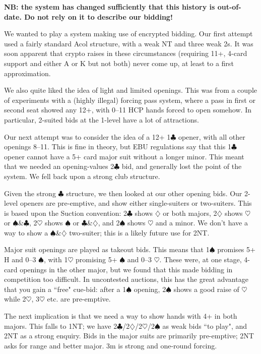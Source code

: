 \documentclass[a4paper,14pt]{extarticle}
\begin{document}
{\bf NB: the system has changed sufficiently that this history is out-of-date.  Do
not rely on it to describe our bidding! }

We wanted to play a system making use of encrypted bidding.  Our first attempt
used a fairly standard Acol structure, with a weak NT and three weak 2s.  It
was soon apparent that crypto raises in these circumstances (requiring 11+,
4-card support and either A or K but not both) never come up, at least to a
first approximation.

We also quite liked the idea of light and limited openings.  This was from a
couple of experiments with a (highly illegal) forcing pass system, where a pass
in first or second seat showed any 12+, with 0--11 HCP hands forced to open
somehow.  In particular, 2-suited bids at the 1-level have a lot of
attractions.

Our next attempt was to consider the idea of a 12+ 1$\clubsuit$ opener, with all other
openings 8--11.  This is fine in theory, but EBU regulations say that this 1$\clubsuit$
opener cannot have a 5+ card major suit without a longer minor.  This meant
that we needed an opening-values 2$\clubsuit$ bid, and generally lost the point of the
system.  We fell back upon a strong club structure.

Given the strong $\clubsuit$ structure, we then looked at our other opening bids.  Our
2-level openers are pre-emptive, and show either single-suiters or two-suiters.
This is based upon the Suction convention: 2$\clubsuit$ shows $\diamondsuit$ or both majors, 2$\diamondsuit$ shows
$\heartsuit$ or $\spadesuit$\&$\clubsuit$, 2$\heartsuit$ shows $\spadesuit$ or $\clubsuit$\&$\diamondsuit$, and 2$\spadesuit$ shows $\heartsuit$ and a minor.  We don't have a way
to show a $\spadesuit$\&$\diamondsuit$ two-suiter; this is a likely future use for 2NT.

Major suit openings are played as takeout bids.  This means that 1$\spadesuit$ promises 5+
H and 0--3 $\spadesuit$, with 1$\heartsuit$ promising 5+ $\spadesuit$ and 0--3 $\heartsuit$.  These were, at one stage,
4-card openings in the other major, but we found that this made bidding in
competition too difficult.  In uncontested auctions, this has the great
advantage that you gain a ``free" cue-bid: after a 1$\spadesuit$ opening, 2$\spadesuit$ shows a good
raise of $\heartsuit$ while 2$\heartsuit$, 3$\heartsuit$ etc. are pre-emptive.

The next implication is that we need a way to show hands with 4+ in both
majors.  This falls to 1NT; we have 2$\clubsuit$/2$\diamondsuit$/2$\heartsuit$/2$\spadesuit$ as weak bids ``to play", and 2NT
as a strong enquiry.  Bids in the major suits are primarily pre-emptive; 2NT
asks for range and better major.  3m is strong and one-round forcing.
\end{document}
